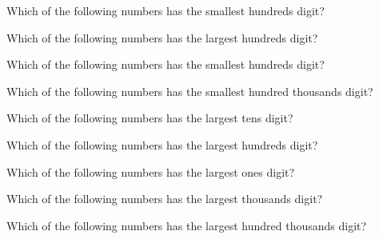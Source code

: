 \documentclass[10pt]{exam}
\begin{document}
\extraheadheight{1in}
\headrule
\extrawidth{0.5in}
\extrafootheight{0.9in}

\large
\begin{multicols*}{2}
\begin{questions}
\question Which of the following numbers has the smallest hundreds digit?

\begin{oneparchoices}
\end{oneparchoices}
\question Which of the following numbers has the largest hundreds digit?

\begin{oneparchoices}
\end{oneparchoices}
\question Which of the following numbers has the smallest hundreds digit?

\begin{oneparchoices}
\end{oneparchoices}
\question Which of the following numbers has the smallest hundred thousands digit?

\begin{oneparchoices}
\end{oneparchoices}
\question Which of the following numbers has the largest tens digit?

\begin{oneparchoices}
\end{oneparchoices}
\question Which of the following numbers has the largest hundreds digit?

\begin{oneparchoices}
\end{oneparchoices}
\question Which of the following numbers has the largest ones digit?

\begin{oneparchoices}
\end{oneparchoices}
\question Which of the following numbers has the largest thousands digit?

\begin{oneparchoices}
\end{oneparchoices}
\question Which of the following numbers has the largest hundred thousands digit?


\end{questions}
\end{multicols*}
\end{document}
